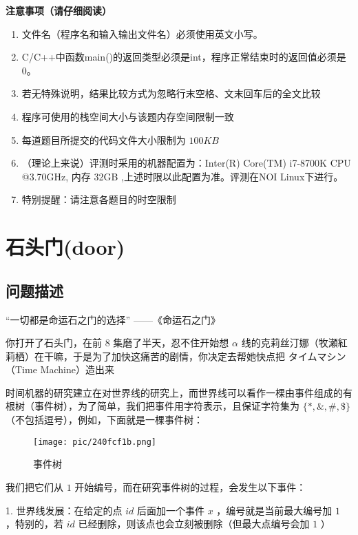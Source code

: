 \documentclass[UTF8]{ctexart}
\begin{document}
\textbf{注意事项（请仔细阅读）}
\begin{enumerate}
    \item{文件名（程序名和输入输出文件名）必须使用英文小写。}
    \item{C/C++中函数main()的返回类型必须是int，程序正常结束时的返回值必须是0。}
    \item{若无特殊说明，结果比较方式为忽略行末空格、文末回车后的全文比较}
    \item{程序可使用的栈空间大小与该题内存空间限制一致}
    \item{每道题目所提交的代码文件大小限制为 $100KB$ }
    \item{（理论上来说）评测时采用的机器配置为：Inter(R) Core(TM) i7-8700K CPU @3.70GHz, 内存 32GB ,上述时限以此配置为准。评测在NOI Linux下进行。}
    \item{特别提醒：请注意各题目的时空限制}
\end{enumerate}
 
\newpage
\setcounter{page}{1}
\pagestyle{plain}
 
\newpage
\section{石头门(door)}
\begin{center}
\end{center}
\subsection{问题描述}
 “一切都是命运石之门的选择”	——《命运石之门》

你打开了石头门，在前 $8$ 集磨了半天，忍不住开始想 $\alpha$ 线的克莉丝汀娜（牧瀬紅莉栖）在干嘛，于是为了加快这痛苦的剧情，你决定去帮她快点把 タイムマシン （Time Machine）造出来

时间机器的研究建立在对世界线的研究上，而世界线可以看作一棵由事件组成的有根树（事件树），为了简单，我们把事件用字符表示，且保证字符集为 $\{*, \&, \#, \$\}$ （不包括逗号），例如，下面就是一棵事件树：

\begin{figure}[h]
    \centering
    \texttt{[image: pic/240fcf1b.png]}
    \caption{事件树}
    \label{fig:enter-label}
\end{figure}

我们把它们从 $1$ 开始编号，而在研究事件树的过程，会发生以下事件：

1. 世界线发展：在给定的点 $id$ 后面加一个事件 $x$ ，编号就是当前最大编号加 $1$ ，特别的，若 $id$ 已经删除，则该点也会立刻被删除（但最大点编号会加 $1$ ）
\end{document}
